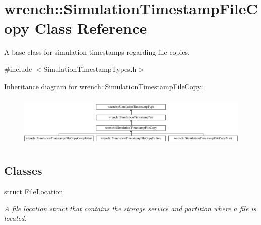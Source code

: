 \hypertarget{classwrench_1_1_simulation_timestamp_file_copy}{}\section{wrench\+:\+:Simulation\+Timestamp\+File\+Copy Class Reference}
\label{classwrench_1_1_simulation_timestamp_file_copy}


A base class for simulation timestamps regarding file copies.  




{\ttfamily \#include $<$Simulation\+Timestamp\+Types.\+h$>$}

Inheritance diagram for wrench\+:\+:Simulation\+Timestamp\+File\+Copy\+:\begin{figure}[H]
\begin{center}
\leavevmode
\includegraphics[height=2.522522cm]{classwrench_1_1_simulation_timestamp_file_copy}
\end{center}
\end{figure}
\subsection*{Classes}
\begin{DoxyCompactItemize}
\item 
struct \hyperlink{structwrench_1_1_simulation_timestamp_file_copy_1_1_file_location}{File\+Location}
\begin{DoxyCompactList}\small\item\em A file location struct that contains the storage service and partition where a file is located. \end{DoxyCompactList}\end{DoxyCompactItemize}
